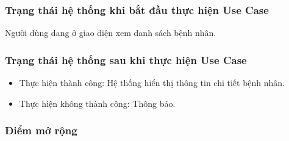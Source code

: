 \subsubsection{Trạng thái hệ thống khi bắt đầu thực hiện Use Case}
Người dùng dang ở giao diện xem danh sách bệnh nhân.

\subsubsection{Trạng thái hệ thống sau khi thực hiện Use Case}
\begin{itemize}
  \item Thực hiện thành công: Hệ thống hiển thị thông tin chi tiết bệnh nhân.
  \item Thực hiện không thành công: Thông báo.
\end{itemize}

\subsubsection{Điểm mở rộng}